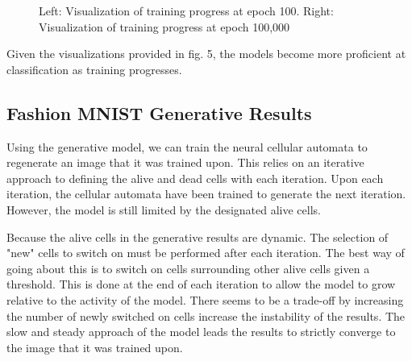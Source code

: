 \documentclass[conference]{IEEEtran}
\begin{document}
\begin{figure}
\begin{minipage}{0.24\textwidth}
    \end{minipage}
    \caption{Left: Visualization of training progress at epoch 100. Right: Visualization of training progress at epoch 100,000}
    \label{fig:fig}
\end{figure}


Given the visualizations provided in fig. 5, the models become more proficient at classification as training progresses. 

\subsection{Fashion MNIST Generative Results}

Using the generative model, we can train the neural cellular automata to regenerate an image that it was trained upon. This relies on an iterative approach to defining the alive and dead cells with each iteration. Upon each iteration, the cellular automata have been trained to generate the next iteration. However, the model is still limited by the designated alive cells. 

Because the alive cells in the generative results are dynamic. The selection of "new" cells to switch on must be performed after each iteration. The best way of going about this is to switch on cells surrounding other alive cells given a threshold. This is done at the end of each iteration to allow the model to grow relative to the activity of the model. There seems to be a trade-off by increasing the number of newly switched on cells increase the instability of the results. The slow and steady approach of the model leads the results to strictly converge to the image that it was trained upon.  
\end{document}
